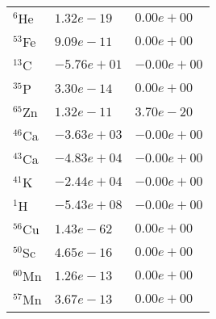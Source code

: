 \begin{tabular}{lll}
 $^{6}$He  & $1.32e-19 $                                                        & $0.00e+00 $                                                                     \\
 $^{53}$Fe & $9.09e-11 $                                                        & $0.00e+00 $                                                                     \\
 $^{13}$C  & $-5.76e+01 $                                                       & $-0.00e+00 $                                                                    \\
 $^{35}$P  & $3.30e-14 $                                                        & $0.00e+00 $                                                                     \\
 $^{65}$Zn & $1.32e-11 $                                                        & $3.70e-20 $                                                                     \\
 $^{46}$Ca & $-3.63e+03 $                                                       & $-0.00e+00 $                                                                    \\
 $^{43}$Ca & $-4.83e+04 $                                                       & $-0.00e+00 $                                                                    \\
 $^{41}$K  & $-2.44e+04 $                                                       & $-0.00e+00 $                                                                    \\
 $^{1}$H   & $-5.43e+08 $                                                       & $-0.00e+00 $                                                                    \\
 $^{56}$Cu & $1.43e-62 $                                                        & $0.00e+00 $                                                                     \\
 $^{50}$Sc & $4.65e-16 $                                                        & $0.00e+00 $                                                                     \\
 $^{60}$Mn & $1.26e-13 $                                                        & $0.00e+00 $                                                                     \\
 $^{57}$Mn & $3.67e-13 $                                                        & $0.00e+00 $                                                                     \\

\end{tabular}
